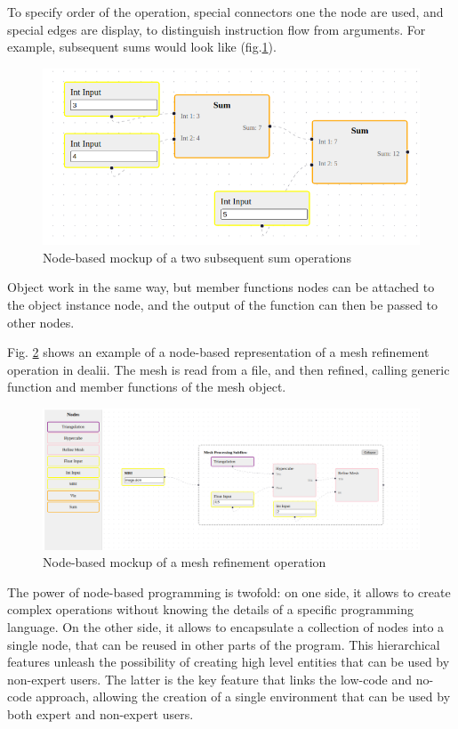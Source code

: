 \documentclass[a4paper,12pt]{article}
\begin{document}
To specify order of the operation, special connectors one the node are used, and special edges are display, to distinguish instruction flow from arguments. For example, subsequent sums would look like (fig.\ref{twosum}).

\begin{figure}
    \label{twosum}
    \includegraphics[width=400pt]{twosum.png}
    \caption{Node-based mockup of a two subsequent sum operations}
\end{figure}
    

Object work in the same way, but member functions nodes can be attached to the object instance node, and the output of the function can then be passed to other nodes.

Fig. \ref{refine} shows an example of a node-based representation of a mesh refinement operation in dealii. The mesh is read from a file, and then refined, calling generic function and member functions of the mesh object.
\begin{figure}
    \label{refine}
    \includegraphics[width=400pt]{refine.png}
    \caption{Node-based mockup of a mesh refinement operation}
\end{figure}


The power of node-based programming is twofold: on one side, it allows to create complex operations without knowing the details of a specific programming language. On the other side, it allows to encapsulate a collection of nodes into a single node, that can be reused in other parts of the program. This hierarchical features unleash the possibility of creating high level entities that can be used by non-expert users. The latter is the key feature that links the low-code and no-code approach, allowing the creation of a single environment that can be used by both expert and non-expert users.
\end{document}
